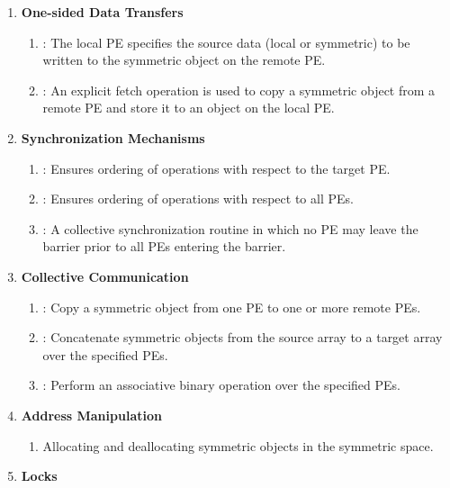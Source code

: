 \begin{enumerate}
\item \textbf{One-sided Data Transfers }

\begin{enumerate}
\item {}: The local \ac{PE} specifies the source
data (local or symmetric) to be written to the symmetric object on the remote \ac{PE}. 
\item {}: An explicit fetch operation is used to copy a symmetric object
from a remote \ac{PE} and store it to an object on the local \ac{PE}.
\end{enumerate}

\item \textbf{Synchronization Mechanisms }
\begin{enumerate}
\item {}: Ensures ordering of  operations with respect to the target \ac{PE}. 
\item {}: Ensures ordering of  operations with respect to all \acp{PE}. 
\item {}: A collective synchronization routine in which no \ac{PE} may leave
the barrier prior to all \ac{PE}s entering the barrier. 
\end{enumerate}
\item \textbf{Collective Communication}

\begin{enumerate}
\item {}: Copy a symmetric object from one \ac{PE} to one or more remote
\acp{PE}. 
\item {}: Concatenate symmetric objects from the source array to a target
array over the specified \acp{PE}. 
\item {}: Perform an associative binary operation over the specified
\ac{PE}s. 
\end{enumerate}
\item \textbf{Address Manipulation}

\begin{enumerate}
\item Allocating and deallocating symmetric objects in the symmetric space.
\end{enumerate}
\item \textbf{Locks}


\end{enumerate}
